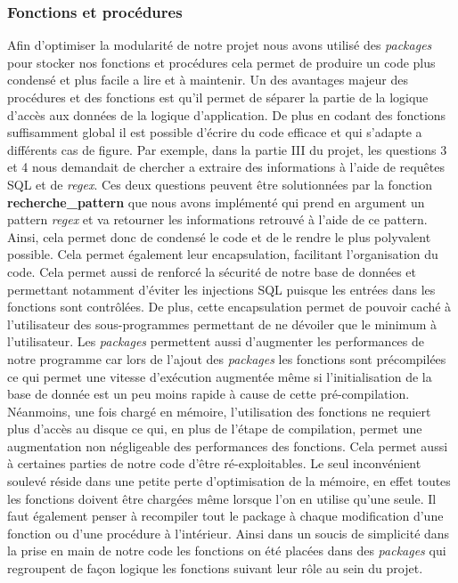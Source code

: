 \documentclass[11pt,a4paper]{article}
\begin{document}
\subsubsection{Fonctions et procédures}
Afin d'optimiser la modularité de notre projet nous avons utilisé des \textit{packages} pour stocker nos fonctions et procédures cela permet de produire un code plus condensé et plus facile a lire et à maintenir. Un des avantages majeur des procédures et des fonctions est qu'il permet de séparer la partie de la logique d'accès aux données de la logique d'application. De plus en codant des fonctions suffisamment global il est possible d'écrire du code efficace et qui s'adapte a différents cas de figure. Par exemple, dans la partie III du projet, les questions 3 et 4 nous demandait de chercher a extraire des informations à l'aide de requêtes SQL et de \textit{regex}. Ces deux questions peuvent être solutionnées par la fonction \textbf{recherche\_pattern} que nous avons implémenté qui prend en argument un pattern \textit{regex} et va retourner les informations retrouvé à l'aide de ce pattern. Ainsi, cela permet donc de condensé le code et de le rendre le plus polyvalent possible.
Cela permet également leur encapsulation, facilitant l'organisation du code. Cela permet aussi de renforcé la sécurité de notre base de données et permettant notamment d'éviter les injections SQL puisque les entrées dans les fonctions sont contrôlées. De plus, cette encapsulation permet de pouvoir caché à l'utilisateur des sous-programmes permettant de ne dévoiler que le minimum à l'utilisateur.
Les \textit{packages} permettent aussi d'augmenter les performances de notre programme car lors de l'ajout des \textit{packages} les fonctions sont précompilées ce qui permet une vitesse d'exécution augmentée même si l'initialisation de la base de donnée est un peu moins rapide à cause de cette pré-compilation. Néanmoins, une fois chargé en mémoire, l'utilisation des fonctions ne requiert plus d'accès au disque ce qui, en plus de l'étape de compilation, permet une augmentation non négligeable des performances des fonctions. Cela permet aussi à certaines parties de notre code d'être ré-exploitables. Le seul inconvénient soulevé réside dans une petite perte d'optimisation de la mémoire, en effet toutes les fonctions doivent être chargées même lorsque l'on en utilise qu'une seule. Il faut également penser à recompiler tout le package à chaque modification d'une fonction ou d'une procédure à l'intérieur.
Ainsi dans un soucis de simplicité dans la prise en main de notre code les fonctions on été placées dans des \textit{packages} qui regroupent de façon logique les fonctions suivant leur rôle au sein du projet.
\end{document}
